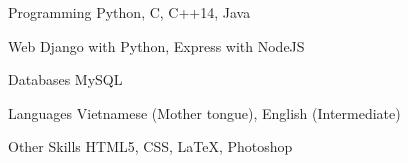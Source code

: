 


\begin{cvskills}


\cvskill
{Programming} %
{Python, C, C++14, Java} %


\cvskill
{Web} %
{Django with Python, Express with NodeJS} %

\cvskill
{Databases} %
{MySQL} %


\cvskill
{Languages} %
{Vietnamese (Mother tongue), English (Intermediate)} %


\cvskill
{Other Skills} %
{HTML5, CSS, LaTeX, Photoshop}%


\end{cvskills}
